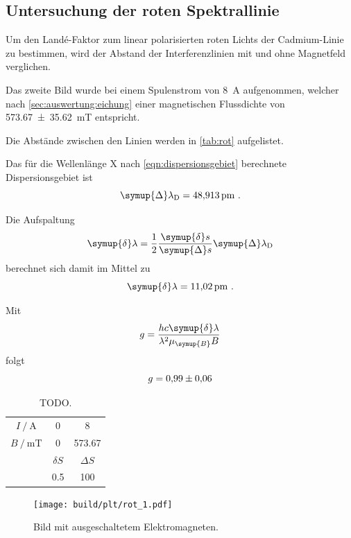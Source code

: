 \subsection{Untersuchung der roten Spektrallinie}
Um den Landé-Faktor zum linear polarisierten roten Lichts der Cadmium-Linie zu bestimmen,
wird der Abstand der Interferenzlinien mit und ohne Magnetfeld verglichen.


Das zweite Bild wurde bei einem Spulenstrom von \SI{8}{\ampere} aufgenommen,
welcher nach \autoref{sec:auswertung:eichung} einer magnetischen Flussdichte von \SI{573.67 \pm 35.62}{\milli\tesla} entspricht.

Die Abstände zwischen den Linien werden in \autoref{tab:rot} aufgelistet.

Das für die Wellenlänge X nach \autoref{eqn:dispersionsgebiet} berechnete Dispersionsgebiet ist
\[
    \symup{\Delta}\lambda_\text{D} = \SI{48.913}{\pico\meter} \ .
\]

Die Aufspaltung
\[
    \symup{\delta} \lambda = \frac{1}{2} \frac{\symup{\delta} s}{\symup{\Delta} s} \symup{\Delta} \lambda_\text{D}
\]
berechnet sich damit im Mittel zu
\[
    \symup{\delta} \lambda = \SI{11.02}{\pico\meter} \ .
\]

Mit
\[
    g = \frac{hc \symup{\delta} \lambda}{\lambda^2 \mu_{\symup{B}} B}
\]
folgt
\[
    g = \num{0.99 \pm 0.06}
\]


\begin{table}
    \centering
    \caption{TODO.}
    \label{tab:rot}
    \begin{tabular}{S S S}
        \toprule
        {$I \mathbin{/} \si{\ampere}$} & 0 & 8 \\
        {$B \mathbin{/} \si{\milli\tesla}$} & 0 & 573.67  \\
        \midrule
        & {$\delta S$} & {$\Delta S$} \\ %
        \midrule
        & 0.5 & 100 \\
        \bottomrule
    \end{tabular}
\end{table}

\begin{figure}
    \centering
    \texttt{[image: build/plt/rot\_1.pdf]}
    \caption{Bild mit ausgeschaltetem Elektromagneten.}
    \label{fig:plt:rot_1}
\end{figure}

